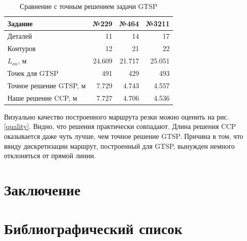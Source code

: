 \documentclass{article}
\begin{document}
\begin{table}[h]
    \begin{center}    
    \begin{tabular}{l|*{3}{r}}
        Задание & №229 & №464 & №3211 \\
        \hline
        Деталей & 11 & 14 & 17\\
        Контуров & 12 & 21 & 22 \\
        $L_{on}$, м & 24.609 & 21.717 & 25.051 \\
        Точек для GTSP & 491 & 429 & 493 \\
        Точное решение GTSP, м & 7.729 & 4.743 & 4.557 \\
        Наше решение CCP, м & 7.727 & 4.706 & 4.536 \\
    \end{tabular}
    \caption{Сравнение с точным решением задачи GTSP}
    \label{exact-3}
    \end{center}
\end{table}

Визуально качество построенного маршрута резки
можно оценить на рис. \ref{quality}.
Видно, что решения практически совпадают.
Длина решения CCP оказывается даже чуть лучше,
чем точное решение GTSP.
Причина в том,
что ввиду дискретизации маршрут,
построенный для GTSP,
вынужден немного отклоняться от прямой линии.

\section{Заключение}

\section{Библиографический список}
\end{document}
